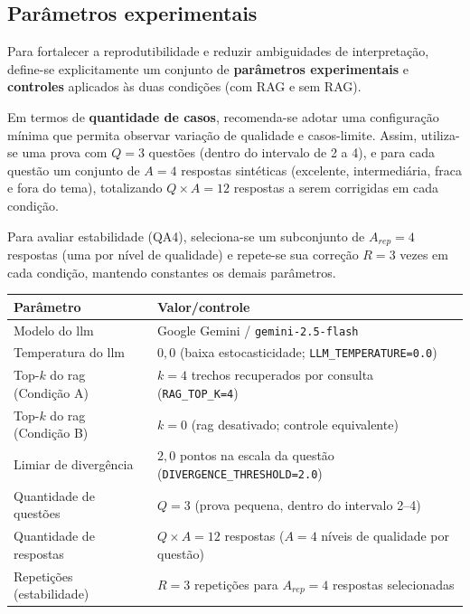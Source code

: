 \subsection{Parâmetros experimentais}
Para fortalecer a reprodutibilidade e reduzir ambiguidades de interpretação, define-se explicitamente um conjunto de \textbf{parâmetros experimentais} e \textbf{controles} aplicados às duas condições (com RAG e sem RAG).

Em termos de \textbf{quantidade de casos}, recomenda-se adotar uma configuração mínima que permita observar variação de qualidade e casos-limite. Assim, utiliza-se uma prova com \(Q=3\) questões (dentro do intervalo de 2 a 4), e para cada questão um conjunto de \(A=4\) respostas sintéticas (excelente, intermediária, fraca e fora do tema), totalizando \(Q \times A = 12\) respostas a serem corrigidas em cada condição.

Para avaliar estabilidade (QA4), seleciona-se um subconjunto de \(A_{rep}=4\) respostas (uma por nível de qualidade) e repete-se sua correção \(R=3\) vezes em cada condição, mantendo constantes os demais parâmetros.

\begin{quadro}[H]
    \centering
    \caption{Parâmetros experimentais utilizados no estudo}
    \label{qua:parametros-experimentais}
    {\small
    \begin{tabularx}{\textwidth}{|p{}|X|}
        \hline
        \textbf{Parâmetro} & \textbf{Valor/controle} \\
        \hline
        Modelo do \gls{llm} & Google Gemini / \texttt{gemini-2.5-flash} \\
        \hline
        Temperatura do \gls{llm} & \(0{,}0\) (baixa estocasticidade; \texttt{LLM\_\allowbreak TEMPERATURE=0.0}) \\
        \hline
        Top-$k$ do \gls{rag} (Condição A) & \(k=4\) trechos recuperados por consulta (\texttt{RAG\_TOP\_\allowbreak K=4}) \\
        \hline
        Top-$k$ do \gls{rag} (Condição B) & \(k=0\) (\gls{rag} desativado; controle equivalente) \\
        \hline
        Limiar de divergência & \(2{,}0\) pontos na escala da questão (\texttt{DIVERGENCE\_\allowbreak THRESHOLD=2.0}) \\
        \hline
        Quantidade de questões & \(Q=3\) (prova pequena, dentro do intervalo 2--4) \\
        \hline
        Quantidade de respostas & \(Q \times A = 12\) respostas (\(A=4\) níveis de qualidade por questão) \\
        \hline
        Repetições (estabilidade) & \(R=3\) repetições para \(A_{rep}=4\) respostas selecionadas \\
        \hline
    \end{tabularx}
    }
\end{quadro}

